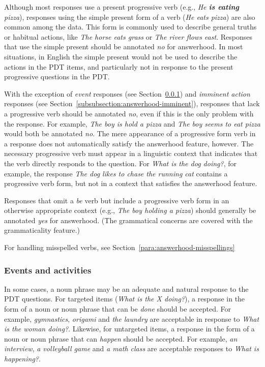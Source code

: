 \documentclass[12pt,notitlepage]{article}
\begin{document}
Although most responses use a present progressive verb (e.g., \textit{He \textbf{is eating} pizza}), responses using the simple present form of a verb (\textit{He eats pizza}) are also common among the data. This form is commonly used to describe general truths or habitual actions, like \textit{The horse eats grass} or \textit{The river flows east}. Responses that use the simple present should be annotated \textit{no} for answerhood. In most situations, in English the simple present would not be used to describe the actions in the PDT items, and particularly not in response to the present progressive questions in the PDT.

With the exception of \textit{event} responses (see Section~\ref{subsubsection:answerhood-events}) and \textit{imminent action} responses (see Section~\ref{subsubsection:answerhood-imminent}), responses that lack a progressive verb should be annotated \textit{no}, even if this is the only problem with the response. For example, \textit{The boy is hold a pizza} and \textit{The boy seems to eat pizza} would both be annotated \textit{no}. The mere appearance of a progressive form verb in a response does not automatically satisfy the answerhood feature, however. The necessary progressive verb must appear in a linguistic context that indicates that the verb directly responds to the question. For \textit{What is the dog doing?}, for example, the response \textit{The dog likes to chase the running cat} contains a progressive verb form, but not in a context that satisfies the answerhood feature.

Responses that omit a \textit{be} verb but include a progressive verb form in an otherwise appropriate context (e.g., \textit{The boy holding a pizza}) should generally be annotated \textit{yes} for answerhood. (The grammatical concerns are covered with the grammaticality feature.)

For handling misspelled verbs, see Section~\ref{para:answerhood-misspellings}

\subsubsection{Events and activities}
\label{subsubsection:answerhood-events} In some cases, a noun phrase may be an adequate and natural response to the PDT questions. For targeted items (\textit{What is the X doing?}), a response in the form of a noun or noun phrase that can be \textit{done} should be accepted. For example, \textit{gymnastics}, \textit{origami} and \textit{the laundry} are acceptable in response to \textit{What is the woman doing?}. Likewise, for untargeted items, a response in the form of a noun or noun phrase that can \textit{happen} should be accepted. For example, \textit{an interview}, \textit{a volleyball game} and \textit{a math class} are acceptable responses to \textit{What is happening?}.
\end{document}
